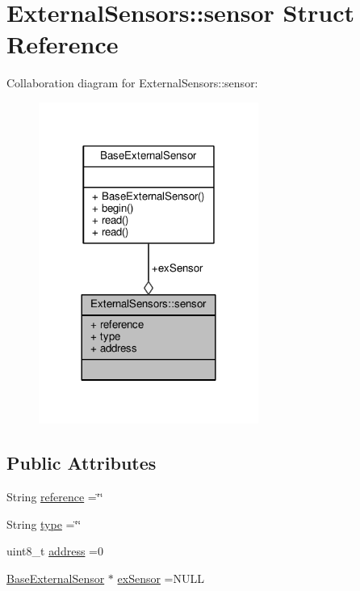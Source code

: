\hypertarget{struct_external_sensors_1_1sensor}{}\section{External\+Sensors\+:\+:sensor Struct Reference}
\label{struct_external_sensors_1_1sensor}


Collaboration diagram for External\+Sensors\+:\+:sensor\+:\nopagebreak
\begin{figure}[H]
\begin{center}
\leavevmode
\includegraphics[width=204pt]{struct_external_sensors_1_1sensor__coll__graph}
\end{center}
\end{figure}
\subsection*{Public Attributes}
\begin{DoxyCompactItemize}
\item 
String \hyperlink{struct_external_sensors_1_1sensor_afed5bdfd49732202a368b600cb8396fe}{reference} =\char`\"{}\char`\"{}
\item 
String \hyperlink{struct_external_sensors_1_1sensor_a6acfdb02c742c2110d7bd2b5d9fce9e7}{type} =\char`\"{}\char`\"{}
\item 
uint8\+\_\+t \hyperlink{struct_external_sensors_1_1sensor_a8d70ca58524521ed054fc6b81eb58d34}{address} =0
\item 
\hyperlink{class_base_external_sensor}{Base\+External\+Sensor} $\ast$ \hyperlink{struct_external_sensors_1_1sensor_a9bca150fd468b8d0e090e6d72c5c2b48}{ex\+Sensor} =N\+U\+LL
\end{DoxyCompactItemize}


